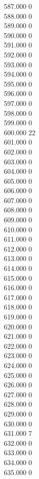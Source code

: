 { 587.000	0 \\
 588.000	0 \\
 589.000	0 \\
 590.000	0 \\
 591.000	0 \\
 592.000	0 \\
 593.000	0 \\
 594.000	0 \\
 595.000	0 \\
 596.000	0 \\
 597.000	0 \\
 598.000	0 \\
 599.000	0 \\
 600.000	22 \\
 601.000	0 \\
 602.000	0 \\
 603.000	0 \\
 604.000	0 \\
 605.000	0 \\
 606.000	0 \\
 607.000	0 \\
 608.000	0 \\
 609.000	0 \\
 610.000	0 \\
 611.000	0 \\
 612.000	0 \\
 613.000	0 \\
 614.000	0 \\
 615.000	0 \\
 616.000	0 \\
 617.000	0 \\
 618.000	0 \\
 619.000	0 \\
 620.000	0 \\
 621.000	0 \\
 622.000	0 \\
 623.000	0 \\
 624.000	0 \\
 625.000	0 \\
 626.000	0 \\
 627.000	0 \\
 628.000	0 \\
 629.000	0 \\
 630.000	0 \\
 631.000	7 \\
 632.000	0 \\
 633.000	0 \\
 634.000	0 \\
 635.000	0 \\
}
